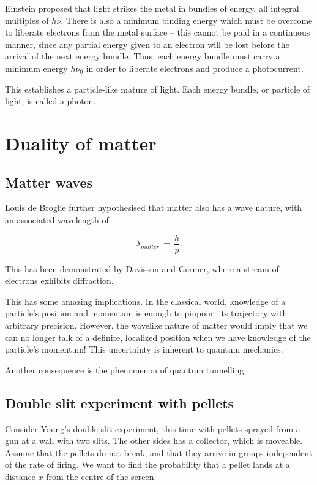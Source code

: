 \documentclass[11pt]{article}
\theoremstyle{definition}
\newenvironment{boxedeq}%
    {\begin{equationbox}\begin{equation}}%
    {\end{equation}\end{equationbox}}
\theoremstyle{remark}
\numberwithin{equation}{section}
\begin{document}
    Einstein proposed that light strikes the metal in bundles of energy, all
    integral multiples of $h\nu$. There is also a minimum binding energy which must
    be overcome to liberate electrons from the metal surface -- this cannot be paid
    in a continuous manner, since any partial energy given to an electron will be
    lost before the arrival of the next energy bundle. Thus, each energy bundle must
    carry a minimum energy $h\nu_0$ in order to liberate electrons and produce a
    photocurrent.

    This establishes a particle-like mature of light. Each energy bundle, or
    particle of light, is called a photon.

    \section{Duality of matter}
    \subsection{Matter waves}
    Louis de Broglie further hypothesised that matter also has a wave nature, with
    an associated wavelength of 
    \begin{boxedeq}
        \lambda_{matter} \,=\, \frac{h}{p}.
    \end{boxedeq}
    This has been demonstrated by Davisson and Germer, where a stream of electrons
    exhibits diffraction.
    
    This has some amazing implications. In the classical world, knowledge of a
    particle's position and momentum is enough to pinpoint its trajectory with
    arbitrary precision. However, the wavelike nature of matter would imply that we
    can no longer talk of a definite, localized position when we have knowledge of
    the particle's momentum! This uncertainty is inherent to quantum mechanics.

    Another consequence is the phenomenon of quantum tunnelling.

    \subsection{Double slit experiment with pellets}
    Consider Young's double slit experiment, this time with pellets sprayed from a
    gun at a wall with two slits. The other sides has a collector, which is
    moveable. Assume that the pellets do not break, and that they arrive in groups
    independent of the rate of firing. We want to find the probability that a pellet
    lands at a distance $x$ from the centre of the screen.
\end{document}
